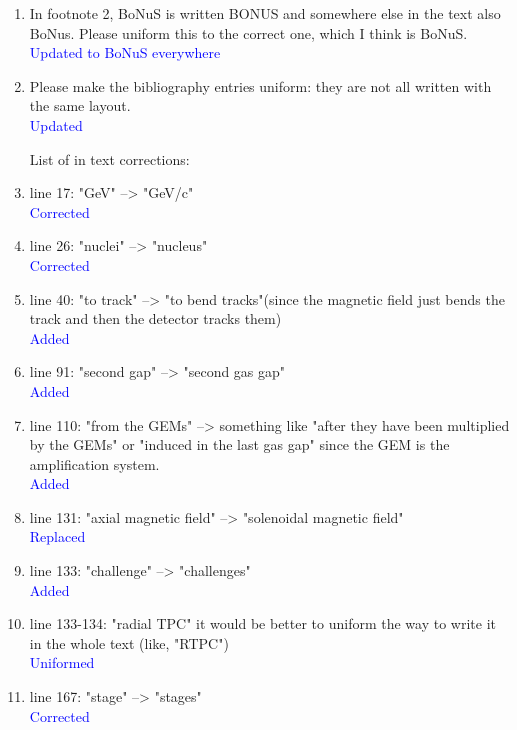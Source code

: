 \documentclass[a4paper,11pt,twoside]{article}
\begin{document}
\begin{enumerate}
\item In footnote 2, BoNuS is written BONUS and somewhere else in the text also 
   BoNus. Please uniform this to the correct one, which I think is BoNuS.\\
\textcolor{blue}{Updated to BoNuS everywhere} 

\item Please make the bibliography entries uniform: they are not all written 
   with the same layout.\\
\textcolor{blue}{Updated} 

List of in text corrections:

\item line 17: "GeV" --> "GeV/c"\\
\textcolor{blue}{Corrected} 

\item line 26: "nuclei" --> "nucleus"\\
\textcolor{blue}{Corrected} 

\item line 40: "to track" --> "to bend tracks"(since the magnetic field just 
   bends the track and then the detector tracks them)\\
\textcolor{blue}{Added} 

\item line 91: "second gap" --> "second gas gap"\\
\textcolor{blue}{Added} 

\item line 110: "from the GEMs" -->  something like "after they have been 
   multiplied by the GEMs" or "induced in the last gas gap" since the GEM is 
   the amplification system.\\
\textcolor{blue}{Added} 

\item line 131: "axial magnetic field" --> "solenoidal magnetic field"\\
\textcolor{blue}{Replaced} 

\item line 133: "challenge" --> "challenges"\\
\textcolor{blue}{Added} 

\item line 133-134: "radial TPC" it would be better to uniform the way to write 
   it in the whole text (like, "RTPC")\\
\textcolor{blue}{Uniformed} 

\item line 167: "stage" --> "stages"\\
\textcolor{blue}{Corrected} 


\end{enumerate}
\end{document}
